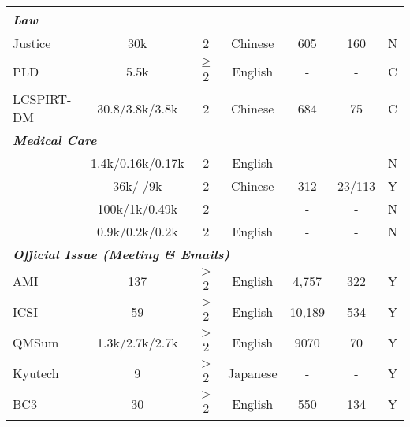 \begin{table}[t]
\begin{tabular}{|l|c|c|c|c|c|c|}
			\hline
			\multicolumn{6}{|l|}{\bf \em{Law}} \\
			
			\hline
			{Justice~\cite{fuzw20}} & 30k%
			& 2 & Chinese & 605 & 160 & N \\
			
			\hline
			{PLD~\cite{duan2019legal}} & 5.5k& $\geq$2 & English  & - & - & C \\
			
			\hline
			{LCSPIRT-DM~\cite{xi2020global}} &  30.8/3.8k/3.8k%
			& 2 &  Chinese& 684 & 75 & C \\
		
			\hline
			\multicolumn{6}{|l|}{\bf \em{Medical Care}} \\
		
			\hline
			{\citet{joshi2020dr}} & 1.4k/0.16k/0.17k%
			& 2 & English & - & - & N \\
			
			\hline
			{\citet{song2020summarizing}} & 36k/-/9k %
			& 2& Chinese  & 312 & 23/113 & Y\\
			
			\hline
			{\citet{liu2019topic}} & 100k/1k/0.49k
			& 2 &  \tabincell{l}{English}& - & - &N \\
			
			\hline
			{\citet{zhang2021leveraging}} & 0.9k/0.2k/0.2k %
			& 2 & English & - & - & N \\
			
			\hline
			\multicolumn{6}{|l|}{\bf \em{Official Issue (Meeting \& Emails)}} \\
			
			\hline
			{AMI~\cite{carletta2005ami}} &137 %
			& $>$2 & English & 4,757 & 322 & Y \\
			
			\hline
			{ICSI~\cite{janin2003icsi}} & 59 %
			& $>$2 & English & 10,189 & 534 & Y \\
			
			\hline
			{QMSum~\cite{zhong2021qmsum}} & 1.3k/2.7k/2.7k%
			& $>$2 & English & 9070 & 70 & Y \\
			
				\hline
			{Kyutech~\cite{yamamura2016kyutech,nakayama2021corpus}} &  9 
			& $>$2 & Japanese & - & - & Y \\
			
			\hline
			{BC3~\cite{ulrich2008publicly}} & 30%
			& $>$2 & English & 550 & 134 & Y \\
			

\end{tabular}
\end{table}
